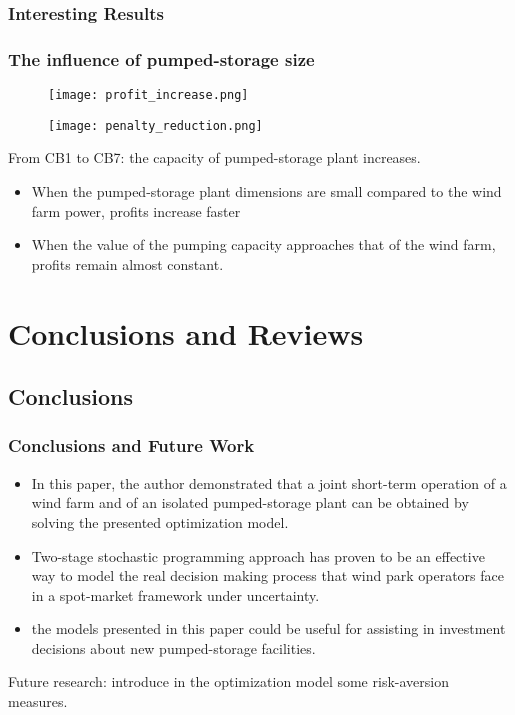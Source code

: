 \subsubsection{Interesting Results}
\begin{frame}
\frametitle{The influence of pumped-storage size}
\begin{figure}[htbp]
  \centering
  \begin{minipage}[htbp]{0.45\linewidth}
    \texttt{[image: profit\_increase.png]}
  \end{minipage}
  \begin{minipage}[htbp]{0.45\linewidth}
    \texttt{[image: penalty\_reduction.png]}
  \end{minipage}
\end{figure}
From CB1 to CB7: the capacity of pumped-storage plant increases.
\begin{itemize}
\item When the pumped-storage plant dimensions are small compared to the wind farm power, profits increase faster
\item When the value of the pumping capacity approaches that of the wind farm, profits remain almost constant.
\end{itemize}

\end{frame}

\section{Conclusions and Reviews}
\subsection{Conclusions}
\begin{frame}
\frametitle{Conclusions and Future Work}
\begin{itemize}
\item In this paper, the author demonstrated that a joint short-term operation of a wind farm and of an isolated pumped-storage plant can be obtained by solving the presented optimization model.
\item Two-stage stochastic programming approach has proven to be an effective way to model the real decision making process that wind park operators face in a spot-market framework under uncertainty.
\item the models presented in this paper could be useful for assisting in investment decisions about new pumped-storage facilities.
\end{itemize}
Future research: introduce in the optimization model some risk-aversion measures.
\end{frame}
